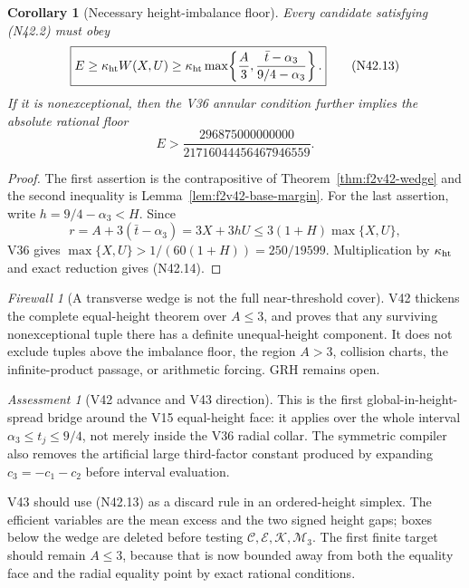 \documentclass[11pt]{article}
\newtheorem{corollary}[theorem]{Corollary}
\theoremstyle{definition}
\theoremstyle{remark}
\newtheorem{assessment}[theorem]{Assessment}
\newtheorem{firewall}[theorem]{Firewall}
\begin{document}
\begin{corollary}[Necessary height-imbalance floor]
\label{cor:f2v42-imbalance-floor}
Every candidate satisfying \textup{(N42.2)} must obey
\[
 \boxed{
 E\geq\kappa_{\rm ht}W(X,U)
 \geq\kappa_{\rm ht}\max\!\left\{
 \frac A3,\frac{\bar t-\alpha_3}{9/4-\alpha_3}\right\}.}
\tag{N42.13}
\]
If it is nonexceptional, then the V36 annular condition further implies
the absolute rational floor
\[
 E>
 \frac{296875000000000}{21716044456467946559}.
\tag{N42.14}
\]
\end{corollary}

\begin{proof}
The first assertion is the contrapositive of
Theorem~\ref{thm:f2v42-wedge} and the second inequality is
Lemma~\ref{lem:f2v42-base-margin}.  For the last assertion, write
\(h=9/4-\alpha_3<H\).  Since
\[
 r=A+3(\bar t-\alpha_3)=3X+3hU
 \leq3(1+H)\max\{X,U\},
\]
V36 gives
\(\max\{X,U\}>1/(60(1+H))=250/19599\).
Multiplication by \(\kappa_{\rm ht}\) and exact reduction gives
\textup{(N42.14)}.
\end{proof}

\begin{firewall}[A transverse wedge is not the full near-threshold cover]
\label{fire:f2v42}
V42 thickens the complete equal-height theorem over \(A\leq3\), and proves
that any surviving nonexceptional tuple there has a definite unequal-height
component.  It does not exclude tuples above the imbalance floor, the
region \(A>3\), collision charts, the infinite-product passage, or
arithmetic forcing.  GRH remains open.
\end{firewall}

\begin{assessment}[V42 advance and V43 direction]
\label{ass:f2v42}
This is the first global-in-height-spread bridge around the V15
equal-height face: it applies over the whole interval
\(\alpha_3\leq t_j\leq9/4\), not merely inside the V36 radial collar.
The symmetric compiler also removes the artificial large third-factor
constant produced by expanding \(c_3=-c_1-c_2\) before interval
evaluation.

V43 should use \textup{(N42.13)} as a discard rule in an ordered-height
simplex.  The efficient variables are the mean excess and the two signed
height gaps; boxes below the wedge are deleted before testing
\(\mathcal C,\mathcal E,\mathcal K,\mathcal M_3\).  The first finite
target should remain \(A\leq3\), because that is now bounded away from
both the equality face and the radial equality point by exact rational
conditions.
\end{assessment}
\end{document}
